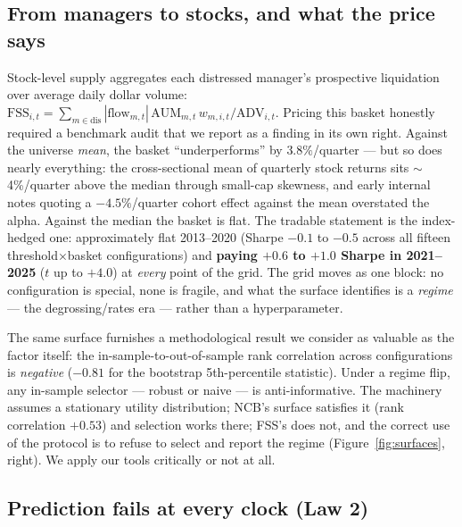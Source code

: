 \subsection{From managers to stocks, and what the price says}

Stock-level supply aggregates each distressed manager's
prospective liquidation over average daily dollar volume:
$\mathrm{FSS}_{i,t}=\sum_{m \in \mathrm{dis}}
|\mathrm{flow}_{m,t}|\,\mathrm{AUM}_{m,t}\, w_{m,i,t} /
\mathrm{ADV}_{i,t}$. Pricing this basket honestly required a
benchmark audit that we report as a finding in its own right. Against
the universe \emph{mean}, the basket ``underperforms'' by
$3.8\%$/quarter --- but so does nearly everything: the cross-sectional
mean of quarterly stock returns sits $\sim$4\%/quarter above the
median through small-cap skewness, and early internal notes quoting a
$-4.5\%$/quarter cohort effect against the mean overstated the alpha.
Against the median the basket is flat. The tradable statement is the
index-hedged one: approximately flat 2013--2020 (Sharpe $-0.1$ to
$-0.5$ across all fifteen threshold$\times$basket configurations) and
\textbf{paying $+0.6$ to $+1.0$ Sharpe in 2021--2025} ($t$ up to
$+4.0$) at \emph{every} point of the grid. The grid moves as one
block: no configuration is special, none is fragile, and what the
surface identifies is a \emph{regime} --- the degrossing/rates era
--- rather than a hyperparameter.

The same surface furnishes a methodological result we consider as
valuable as the factor itself: the in-sample-to-out-of-sample rank
correlation across configurations is \emph{negative} ($-0.81$ for
the bootstrap 5th-percentile statistic). Under a regime flip, any
in-sample selector --- robust or naive --- is anti-informative. The
\citet{oliveira2025} machinery assumes a stationary utility
distribution; NCB's surface satisfies it (rank correlation $+0.53$)
and selection works there; FSS's does not, and the correct use of the
protocol is to refuse to select and report the regime
(Figure~\ref{fig:surfaces}, right). We apply our tools critically or
not at all.

\subsection{Prediction fails at every clock (Law 2)}

